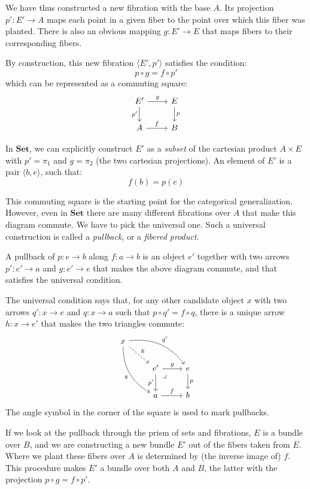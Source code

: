 \documentclass[DaoFP]{subfiles}
\begin{document}
We have thus constructed a new fibration with the base $A$. Its projection $p' \colon E' \to A$ maps each point in a given fiber to the point over which this fiber was planted. There is also an obvious mapping $g \colon E' \to E$ that maps fibers to their corresponding fibers. 

By construction, this new fibration $\langle E', p'\rangle$ satisfies the condition:
\[ p \circ g = f \circ p' \]
which can be represented as a commuting square:
\[
 \begin{tikzcd}
 E'
 \arrow[d, "p'"']
 \arrow[r, "g"]
 & E
 \arrow[d, "p"]
 \\
 A
 \arrow[r, "f"]
 &B
  \end{tikzcd}
\]

In  $\mathbf{Set}$, we can explicitly construct $E'$ as a \emph{subset} of the cartesian product $A \times E$ with $p' = \pi_1$ and $g = \pi_2$ (the two cartesian projections). An element of $E'$ is a pair $\langle b, e \rangle$, such that:
\[ f (b) = p (e) \]

This commuting square is the starting point for the categorical generalization. However, even in $\mathbf{Set}$ there are many different fibrations over $A$ that make this diagram commute. We have to pick the universal one. Such a universal construction is called a \emph{pullback}, or a \emph{fibered product}.

A pullback of $p \colon e \to b$ along $f \colon a \to b$ is an object $e'$ together with two arrows $p' \colon e' \to a$ and $g \colon e' \to e$ that makes the above diagram commute, and that satisfies the universal condition. 

The universal condition says that, for any other candidate object $x$ with two arrows $q' \colon x \to e$ and $q \colon x \to a$ such that $p \circ q' = f \circ q$, there is a unique arrow $h \colon x \to e'$ that makes the two triangles commute:
\[
 \begin{tikzcd}
 x
 \arrow[dr, dashed, "h"]
 \arrow[drr, bend left, "q'"]
 \arrow[ddr, bend right, "q"']
 \\
 &e'
 \arrow[r, "g"]
 \arrow[d, "p'"']
\arrow[dr, phantom,  , very near start, "\lrcorner"]
 &e
 \arrow[d, "p"]
 \\
 &a
 \arrow[r, "f"]
 &b
  \end{tikzcd}
\]
The angle symbol in the corner of the square is used to mark pullbacks.

If we look at the pullback through the prism of sets and fibrations, $E$ is a bundle over $B$, and we are constructing a new bundle $E'$ out of the fibers taken from $E$. Where we plant these fibers over $A$ is determined by (the inverse image of) $f$. This procedure makes $E'$ a bundle over both $A$ and $B$, the latter with the projection $p \circ g = f \circ p'$. 
\end{document}
